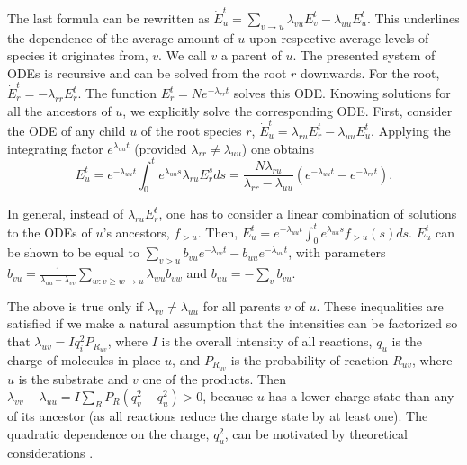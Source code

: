 \documentclass{llncs}
\begin{document}
The last formula can be rewritten as $ \dot E_u^t = \sum_{v\rightarrow u} \lambda_{vu} E_v^t - \lambda_{uu}E_u^t$.
This underlines the dependence of the average amount of $u$ upon respective average levels of species it originates from, $v$.
We call $v$ a parent of $u$.
The presented system of ODEs is recursive and can be solved from the root $r$ downwards.
For the root, $\dot E_r^t=-\lambda_{rr} E_r^t$.
The function $E_r^t= Ne^{-\lambda_{rr}t}$ solves this ODE.
Knowing solutions for all the ancestors of $u$, we explicitly solve the corresponding ODE.
First, consider the ODE of any child $u$ of the root species $r$, $\dot E_u^t= \lambda_{ru} E_r^t-\lambda_{uu} E_u^t$.
Applying the integrating factor $e^{\lambda_{uu}t}$ (provided $\lambda_{rr} \not= \lambda_{uu}$) one obtains
$$E_u^t=e^{-\lambda_{uu}t} \int_0^t e^{\lambda_{uu}s} \lambda_{ru} E_r^s ds = \frac{N \lambda_{ru}}{\lambda_{rr}-\lambda_{uu}}(e^{-\lambda_{uu}t}-e^{-\lambda_{rr}t}).$$

In general, instead of $\lambda_{ru} E_r^t$, one has to consider a linear combination of solutions to the ODEs of $u$'s ancestors, $f_{>u}$. Then, $E_u^t=e^{-\lambda_{uu}t} \int_0^t e^{\lambda_{uu}s} f_{>u}(s)ds$.
$E_u^t$ can be shown to be equal to $\sum_{v>u}b_{vu}e^{-\lambda_{vv}t}-b_{uu}e^{-\lambda_{uu}t}$, with parameters $b_{vu}= \frac{1}{\lambda_{uu}-\lambda_{vv}} \sum_{w: v\geq w \rightarrow u} \lambda_{wu}b_{vw}$ and $b_{uu}=-\sum_v b_{vu}$.

The above is true only if $\lambda_{vv} \not= \lambda_{uu}$ for all parents $v$ of $u$. These inequalities are satisfied if we make a natural assumption that the intensities can be factorized so that $\lambda_{uv} = I q_i^2 P_{R_{uv}}$, where $I$ is the overall intensity of all reactions, $q_u$ is the charge of molecules in place $u$, and $P_{R_{uv}}$ is the probability of reaction $R_{uv}$, where $u$ is the substrate and $v$ one of the products.
Then $\lambda_{vv} - \lambda_{uu} = I \sum_{R} P_R (q_v^2  - q_u^2) > 0$, because $u$ has a lower charge state than any of its ancestor
(as all reactions reduce the charge state by at least one).
The quadratic dependence on the charge, $q_u^2$, can be motivated by theoretical considerations \cite{McLuckey1999-su}.
\end{document}
